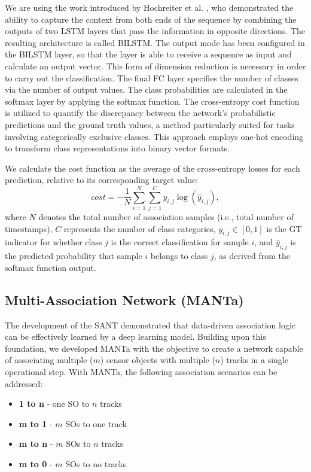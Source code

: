 \documentclass[letterpaper, 10 pt, journal, twoside]{IEEEtran}
\newcommand{\red}[1]{\textcolor{black}{#1}}
\begin{document}
We are using the work introduced by Hochreiter et al. {\cite{DL_LSTM.1997}}, who demonstrated the ability to capture the context from both ends of the sequence by combining the outputs of two LSTM layers that pass the information in opposite directions.
The resulting architecture is called \ac{BILSTM}.
The output mode has been configured in the \ac{BILSTM} layer, so that the layer is able to receive a sequence as input and calculate an output vector.
This form of dimension reduction is necessary in order to carry out the classification.
The final FC layer specifies the number of classes via the number of output values.
The class probabilities are calculated in the softmax layer by applying the softmax function.
The cross-entropy cost function is utilized to quantify the discrepancy between the network's probabilistic predictions and the ground truth values, a method particularly suited for tasks involving categorically exclusive classes.
This approach employs one-hot encoding to transform class representations into binary vector formats.

We calculate the cost function as the average of the cross-entropy losses for each prediction, relative to its corresponding target value:
\begin{equation}
    cost = -\frac{1}{N} \sum_{i=1}^{N} \sum_{j=1}^{C} y_{i,j} \log(\hat{y}_{i,j}),
\end{equation}
\noindent
\red{where $N$ denotes the} total number of association samples (i.e., total number of timestamps), $C$ represents the number of class categories, $y_{i,j}\in [0,1]$ is the GT indicator for whether class $j$ is the correct classification for sample $i$, and $\hat{y}_{i,j}$ is the predicted probability that sample $i$ belongs to class $j$, as derived from the softmax function output.

\subsection{Multi-Association Network (MANTa)}
The development of the \ac{SANT} demonstrated that data-driven association logic can be effectively learned by a deep learning model.
Building upon this foundation, we developed MANTa with the objective to create a network capable of associating multiple ($m$) sensor objects with multiple ($n$) tracks in a single operational step.
With MANTa, the following association scenarios can be addressed:

\begin{itemize}
    \item \textbf{1 to n} - one \ac{SO} to $n$ tracks %
    \item \textbf{m to 1} - $m$ \acp{SO} to one track
    \item \textbf{m to n} - $m$ \acp{SO} to $n$ tracks
    \item \textbf{m to 0} - $m$ \acp{SO} to no tracks
\end{itemize}
\end{document}
